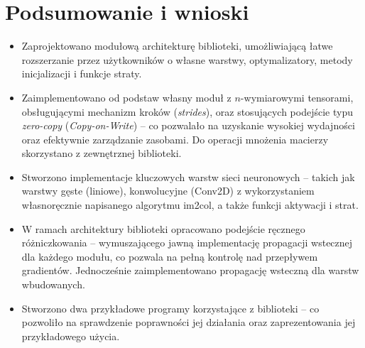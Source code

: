 \section*{Podsumowanie i wnioski}
\begin{itemize}
	\item Zaprojektowano modułową architekturę biblioteki, umożliwiającą łatwe rozszerzanie
	      przez użytkowników o własne warstwy, optymalizatory, metody inicjalizacji i funkcje straty.
	\item Zaimplementowano od podstaw własny moduł z $n$-wymiarowymi tensorami, obsługującymi
	      mechanizm kroków (\textit{strides}), oraz stosujących podejście typu \textit{zero-copy}
	      (\textit{Copy-on-Write}) -- co pozwalało na uzyskanie wysokiej wydajności oraz efektywnie
	      zarządzanie zasobami. Do operacji mnożenia macierzy skorzystano z zewnętrznej biblioteki.
	\item Stworzono implementacje kluczowych warstw sieci neuronowych -- takich jak warstwy gęste
	      (liniowe), konwolucyjne (Conv2D) z wykorzystaniem własnoręcznie napisanego algorytmu im2col,
	      a także funkcji aktywacji i strat.
	\item W ramach architektury biblioteki opracowano podejście ręcznego różniczkowania -- wymuszającego
	      jawną implementację propagacji wstecznej dla każdego modułu, co pozwala na pełną kontrolę nad przepływem
	      gradientów. Jednocześnie zaimplementowano propagację wsteczną dla warstw wbudowanych.
	\item Stworzono dwa przykładowe programy korzystające z biblioteki -- co pozwoliło na sprawdzenie
	      poprawności jej działania oraz zaprezentowania jej przykładowego użycia.
\end{itemize}
